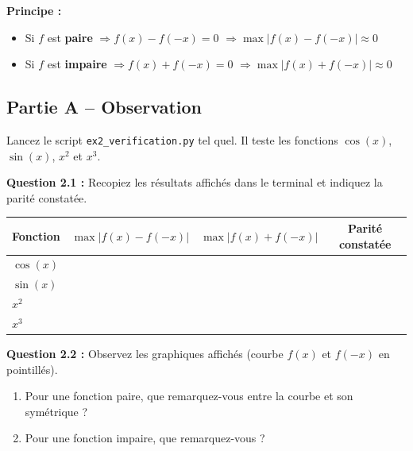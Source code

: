\documentclass[12pt,a4paper]{article}
\begin{document}
\begin{rappelbox}
\textbf{Principe :}
\begin{itemize}
    \item Si $f$ est \textbf{paire} $\Rightarrow f(x) - f(-x) = 0$ $\Rightarrow \max|f(x)-f(-x)| \approx 0$
    \item Si $f$ est \textbf{impaire} $\Rightarrow f(x) + f(-x) = 0$ $\Rightarrow \max|f(x)+f(-x)| \approx 0$
\end{itemize}
\end{rappelbox}

\subsection{Partie A -- Observation}

\begin{fichierbox}
Lancez le script \texttt{ex2\_verification.py} tel quel. Il teste les fonctions $\cos(x)$, $\sin(x)$, $x^2$ et $x^3$.
\end{fichierbox}

\begin{exercicebox}
\textbf{Question 2.1 :} Recopiez les résultats affichés dans le terminal et indiquez la parité constatée.

\medskip
\renewcommand{\arraystretch}{2}
\begin{center}
\begin{tabular}{|l|c|c|c|}
    \hline
    \textbf{Fonction} & $\max|f(x)-f(-x)|$ & $\max|f(x)+f(-x)|$ & \textbf{Parité constatée} \\
    \hline
    $\cos(x)$ & & & \\
    \hline
    $\sin(x)$ & & & \\
    \hline
    $x^2$ & & & \\
    \hline
    $x^3$ & & & \\
    \hline
\end{tabular}
\end{center}
\end{exercicebox}

\begin{exercicebox}
\textbf{Question 2.2 :} Observez les graphiques affichés (courbe $f(x)$ et $f(-x)$ en pointillés).
\begin{enumerate}[label=\alph*)]
    \item Pour une fonction paire, que remarquez-vous entre la courbe et son symétrique ?
    \item Pour une fonction impaire, que remarquez-vous ?
\end{enumerate}
\end{exercicebox}
\end{document}
